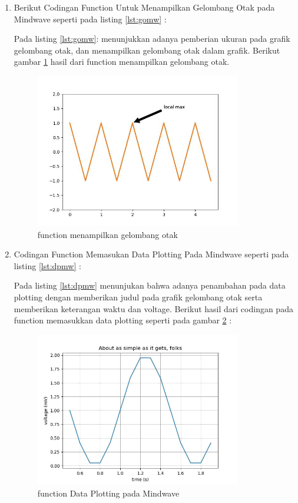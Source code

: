 \begin{enumerate}
\item Berikut Codingan Function Untuk Menampilkan Gelombang Otak pada Mindwave seperti pada listing \ref{lst:gomw} : 

Pada listing \ref{lst:gomw}: menunjukkan adanya pemberian ukuran pada grafik gelombang otak, dan menampilkan  gelombang otak dalam grafik. Berikut gambar \ref{fig:gomw} hasil dari function menampilkan gelombang otak.
\begin{figure}[!htbp]
	\centerline{\includegraphics[width=0.85\textwidth]{figures/4/gomw.PNG}}
	\caption{function menampilkan gelombang otak}
	\label{fig:gomw}
\end{figure}

\item Codingan Function Memasukan Data Plotting Pada Mindwave seperti pada listing \ref{lst:dpmw} : 

Pada listing \ref{lst:dpmw} menunjukan bahwa adanya penambahan pada data plotting dengan memberikan judul pada grafik gelombang otak serta memberikan keterangan waktu dan voltage. Berikut hasil dari codingan pada function memasukkan data plotting seperti pada gambar \ref{fig:dpmw} :
\begin{figure}[!htbp]
	\centerline{\includegraphics[width=0.85\textwidth]{figures/4/dpmw.PNG}}
	\caption{function Data Plotting pada Mindwave}
	\label{fig:dpmw}
\end{figure}


\end{enumerate}
